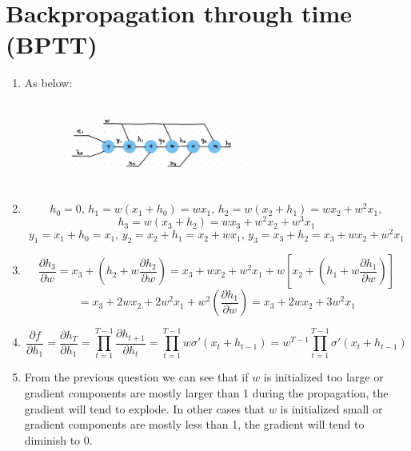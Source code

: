\documentclass[12pt]{article}
\begin{document}
\section{Backpropagation through time (BPTT)}
\begin{enumerate}
    \item As below:
    \begin{figure}[htbp]
        \centering
        \includegraphics[width=0.6\textwidth]{2.1}
    \end{figure}
    \item   \[h_0 = 0, \, h_1 = w(x_1 + h_0) = wx_1, \, h_2 = w(x_2 + h_1) = wx_2 + w^2x_1,\] 
    \[h_3 = w(x_3 + h_2) = wx_3 + w^2x_2 + w^3x_1\]
    \[y_1 = x_1 + h_0 = x_1, \, y_2 = x_2 + h_1 = x_2 + wx_1, \, y_3 = x_3 + h_2 = x_3 + wx_2 + w^2x_1\]
    \item   \[\frac{\partial h_3}{\partial w} = x_3 + (h_2 + w\frac{\partial h_2}{\partial w}) = x_3 + wx_2 + w^2x_1 + w[x_2 + (h_1 + w\frac{\partial h_1}{\partial w})]\] 
    \[= x_3 + 2wx_2 + 2w^2x_1 + w^2(\frac{\partial h_1}{\partial w}) = x_3 + 2wx_2 + 3w^2x_1\]
    \item   \[\frac{\partial f}{\partial h_1} = \frac{\partial h_T}{\partial h_1} = \prod_{t = 1}^{T-1} \frac{\partial h_{t+1}}{\partial h_t} = \prod_{t = 1}^{T-1} w\sigma'(x_t + h_{t-1}) = w^{T-1}\prod_{t = 1}^{T-1} \sigma'(x_t + h_{t-1})\]
    \item   From the previous question we can see that if $w$ is initialized too large or gradient components are mostly larger than 1 during the propagation, the gradient will tend to explode. In other cases that $w$ is initialized small or gradient components are mostly less than 1, the gradient will tend to diminish to 0.
\end{enumerate}
\newpage
\end{document}
